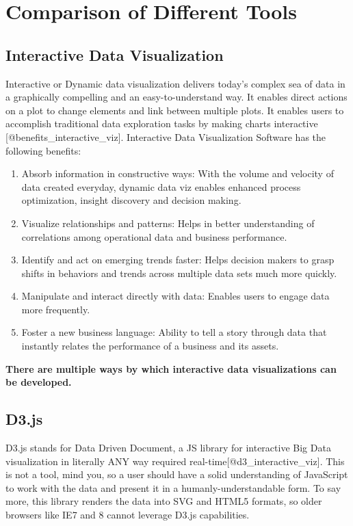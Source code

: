 \documentclass[]{book}
\providecommand{\tightlist}{%
  \setlength{\itemsep}{0pt}\setlength{\parskip}{0pt}}
\theoremstyle{definition}
\theoremstyle{definition}
\theoremstyle{definition}
\theoremstyle{remark}
\begin{document}
\section{Comparison of Different
Tools}\label{comparison-of-different-tools}

\subsection{Interactive Data
Visualization}\label{interactive-data-visualization}

Interactive or Dynamic data visualization delivers today's complex sea
of data in a graphically compelling and an easy-to-understand way. It
enables direct actions on a plot to change elements and link between
multiple plots. It enables users to accomplish traditional data
exploration tasks by making charts interactive
{[}@benefits\_interactive\_viz{]}. Interactive Data Visualization
Software has the following benefits:

\begin{enumerate}
\def\labelenumi{\arabic{enumi}.}
\tightlist
\item
  Absorb information in constructive ways: With the volume and velocity
  of data created everyday, dynamic data viz enables enhanced process
  optimization, insight discovery and decision making.
\item
  Visualize relationships and patterns: Helps in better understanding of
  correlations among operational data and business performance.
\item
  Identify and act on emerging trends faster: Helps decision makers to
  grasp shifts in behaviors and trends across multiple data sets much
  more quickly.
\item
  Manipulate and interact directly with data: Enables users to engage
  data more frequently.
\item
  Foster a new business language: Ability to tell a story through data
  that instantly relates the performance of a business and its assets.
\end{enumerate}

\textbf{There are multiple ways by which interactive data visualizations
can be developed.}

\subsection{D3.js}\label{d3.js}

D3.js stands for Data Driven Document, a JS library for interactive Big
Data visualization in literally ANY way required
real-time{[}@d3\_interactive\_viz{]}. This is not a tool, mind you, so a
user should have a solid understanding of JavaScript to work with the
data and present it in a humanly-understandable form. To say more, this
library renders the data into SVG and HTML5 formats, so older browsers
like IE7 and 8 cannot leverage D3.js capabilities.
\end{document}
